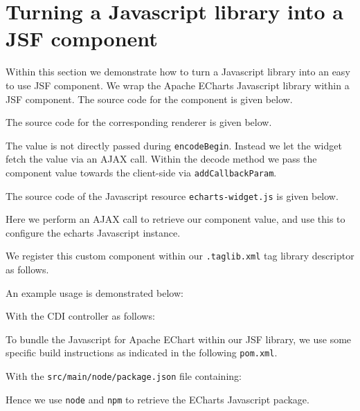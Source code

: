 \section{Turning a Javascript library into a JSF component}
Within this section we demonstrate how to turn a Javascript library into an easy to use JSF component.
We wrap the Apache ECharts \cite{ECharts} Javascript library within a JSF component.
The source code for the component is given below.


The source code for the corresponding renderer is given below.

The value is not directly passed during \texttt{encodeBegin}.
Instead we let the widget fetch the value via an AJAX call.
Within the decode method we pass the component value towards the client-side via \texttt{addCallbackParam}.

The source code of the Javascript resource \texttt{echarts-widget.js} is given below.

Here we perform an AJAX call to retrieve our component value, and use this to configure the echarts Javascript instance.

We register this custom component within our \texttt{.taglib.xml} tag library descriptor as follows.


An example usage is demonstrated below:


With the CDI controller as follows:


To bundle the Javascript for Apache EChart within our JSF library, we use some specific build instructions as indicated in the following \texttt{pom.xml}.

With the \texttt{src/main/node/package.json} file containing:

Hence we use \texttt{node} and \texttt{npm} to retrieve the ECharts Javascript package.

